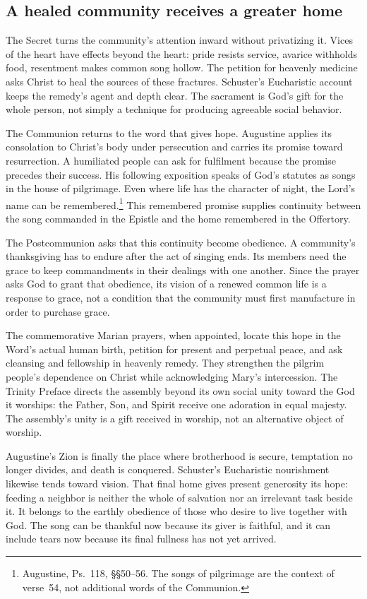 \subsection{A healed community receives a greater home}
The Secret turns the community's attention inward without privatizing
it. Vices of the heart have effects beyond the heart: pride resists
service, avarice withholds food, resentment makes common song hollow.
The petition for heavenly medicine asks Christ to heal the sources of
these fractures. Schuster's Eucharistic account keeps the remedy's
agent and depth clear. The sacrament is God's gift for the whole person,
not simply a technique for producing agreeable social behavior.

The Communion returns to the word that gives hope. Augustine applies
its consolation to Christ's body under persecution and carries its
promise toward resurrection. A humiliated people can ask for fulfilment
because the promise precedes their success. His following exposition
speaks of God's statutes as songs in the house of pilgrimage. Even
where life has the character of night, the Lord's name can be remembered.\footnote{Augustine, Ps.~118, \S\S50--56. The songs of pilgrimage are
the context of verse~54, not additional words of the Communion.}
This remembered promise supplies continuity between the song commanded
in the Epistle and the home remembered in the Offertory.

The Postcommunion asks that this continuity become obedience. A
community's thanksgiving has to endure after the act of singing ends.
Its members need the grace to keep commandments in their dealings with
one another. Since the prayer asks God to grant that obedience, its
vision of a renewed common life is a response to grace, not a condition
that the community must first manufacture in order to purchase grace.

The commemorative Marian prayers, when appointed, locate this hope in
the Word's actual human birth, petition for present and perpetual peace,
and ask cleansing and fellowship in heavenly remedy. They strengthen
the pilgrim people's dependence on Christ while acknowledging Mary's
intercession. The Trinity Preface directs the assembly beyond its own
social unity toward the God it worships: the Father, Son, and Spirit
receive one adoration in equal majesty. The assembly's unity is a gift
received in worship, not an alternative object of worship.

Augustine's Zion is finally the place where brotherhood is secure,
temptation no longer divides, and death is conquered. Schuster's
Eucharistic nourishment likewise tends toward vision. That final home
gives present generosity its hope: feeding a neighbor is neither the
whole of salvation nor an irrelevant task beside it. It belongs to
the earthly obedience of those who desire to live together with God.
The song can be thankful now because its giver is faithful, and it
can include tears now because its final fullness has not yet arrived.

